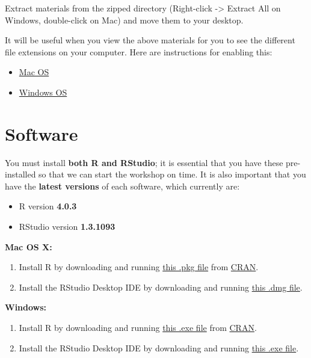 \documentclass[
]{book}
\providecommand{\tightlist}{%
  \setlength{\itemsep}{0pt}\setlength{\parskip}{0pt}}
\begin{document}
Extract materials from the zipped directory (Right-click -\textgreater{} Extract All on Windows, double-click on Mac) and move them to your desktop.

It will be useful when you view the above materials for you to see the different file extensions on your computer. Here are instructions for enabling this:

\begin{itemize}
\tightlist
\item
  \href{https://support.apple.com/guide/mac-help/show-or-hide-filename-extensions-on-mac-mchlp2304/mac}{Mac OS}
\item
  \href{http://kb.winzip.com/kb/entry/26/}{Windows OS}
\end{itemize}

\hypertarget{software}{%
\section{Software}\label{software}}

You must install \textbf{both R and RStudio}; it is essential that you have these pre-installed so that we can start the workshop on time. It is also important that you have the \textbf{latest versions} of each software, which currently are:

\begin{itemize}
\tightlist
\item
  R version \textbf{4.0.3}
\item
  RStudio version \textbf{1.3.1093}
\end{itemize}

\textbf{Mac OS X:}

\begin{enumerate}
\def\labelenumi{\arabic{enumi}.}
\tightlist
\item
  Install R by downloading and running \href{http://cran.r-project.org/bin/macosx/R-latest.pkg}{this .pkg file} from \href{http://cran.r-project.org/index.html}{CRAN}.
\item
  Install the RStudio Desktop IDE by downloading and running \href{https://download1.rstudio.org/desktop/macos/RStudio-1.3.1073.dmg}{this .dmg file}.
\end{enumerate}

\textbf{Windows:}

\begin{enumerate}
\def\labelenumi{\arabic{enumi}.}
\tightlist
\item
  Install R by downloading and running \href{https://cran.r-project.org/bin/windows/base/release.htm}{this .exe file} from \href{http://cran.r-project.org/index.html}{CRAN}.
\item
  Install the RStudio Desktop IDE by downloading and running \href{https://download1.rstudio.org/desktop/windows/RStudio-1.3.1073.exe}{this .exe file}.
\end{enumerate}
\end{document}
